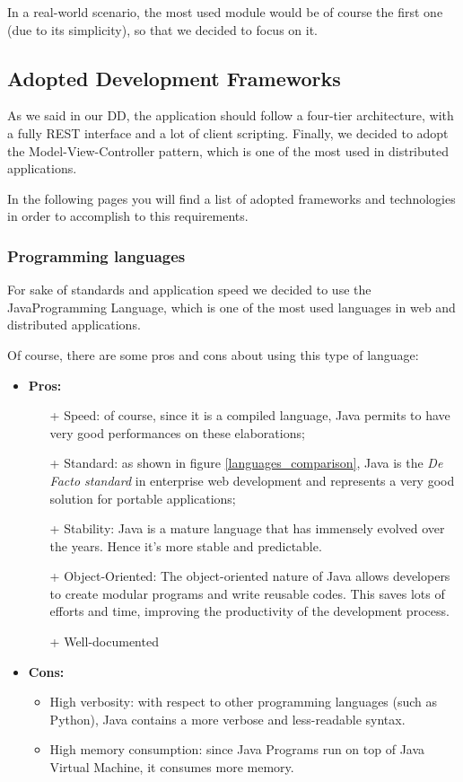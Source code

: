 \documentclass[table, 12pt]{article}
\begin{document}
In a real-world scenario, the most used module would be of course the first one (due to its simplicity), so that we decided to focus on it.

\subsection{Adopted Development Frameworks}
As we said in our DD, the application should follow a four-tier architecture, with a fully REST interface and a lot of client scripting. Finally, we decided to adopt the Model-View-Controller pattern, which is one of the most used in distributed applications.

In the following pages you will find a list of adopted frameworks and technologies in order to accomplish to this requirements.

\subsubsection{Programming languages}
For sake of standards and application speed we decided to use the Java\texttrademark  Programming Language, which is one of the most used languages in web and distributed applications.

Of course, there are some pros and cons about using this type of language:
\\\begin{itemize}
    \item \textbf{Pros:}
          \begin{itemize}
              \item[+] Speed: of course, since it is a compiled language, Java permits to have very good performances on these elaborations;
              \item[+] Standard: as shown in figure \ref{languages_comparison}, Java is the \textit{De Facto standard} in enterprise web development and represents a very good solution for portable applications;
              \item[+] Stability: Java is a mature language that has immensely evolved over the years. Hence it’s more stable and predictable.
              \item[+] Object-Oriented: The object-oriented nature of Java allows developers to create modular programs and write reusable codes. This saves lots of efforts and time, improving the productivity of the development process.
              \item[+] Well-documented
          \end{itemize}
    \item \textbf{Cons:}
          \begin{itemize}
              \item High verbosity: with respect to other programming languages (such as Python), Java contains a more verbose and less-readable syntax.
              \item High memory consumption: since Java Programs run on top of Java Virtual Machine, it consumes more memory.
          \end{itemize}
\end{itemize}
\end{document}
